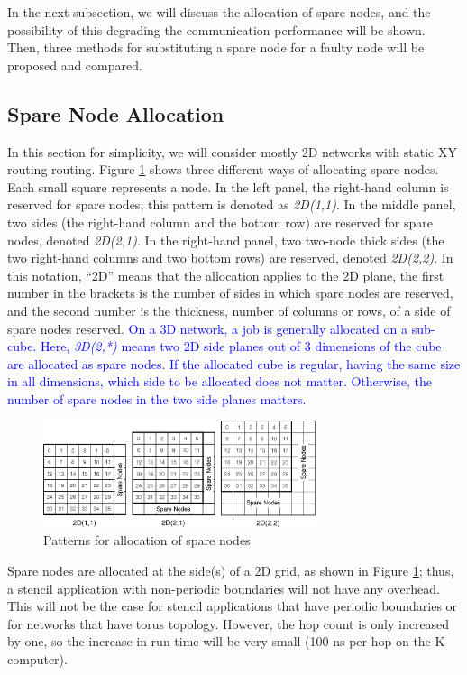 \documentclass[Afour,times,sagev]{sagej}
\newcommand{\AH}[1]{%
  \textcolor{blue}{#1}}%
\begin{document}
In the next subsection, we will discuss the allocation of spare nodes, and
the possibility of this degrading the communication performance will be
shown. Then, three methods for substituting a spare node for a faulty
node will be proposed and compared.

\subsection{Spare Node Allocation}\label{sec:spare-alloc}

In this section for simplicity, we will consider mostly 2D networks with
static XY routing routing\citep{Zhang:2009:CRX:1603897.1605067}.
Figure \ref{fig:sparenode-allocation} shows three different ways of
allocating spare nodes. Each small square represents a node. In the
left panel, the right-hand column is reserved for spare nodes; this
pattern is denoted as {\it 2D(1,1)}. In the middle panel, two sides
(the right-hand column and the bottom row) are reserved for spare
nodes, denoted {\it 2D(2,1)}. In the right-hand panel, two two-node
thick sides (the two right-hand columns and two bottom rows) are
reserved, denoted {\it 2D(2,2)}. In this notation, ``2D'' means that
the allocation applies to the 2D plane, the first number in the
brackets is the number of sides in which spare nodes are reserved, and
the second number is the thickness, number of columns or rows, of a
side of spare nodes reserved. \AH{On a 3D network, a job is generally
allocated on a sub-cube. Here, {\it 3D(2,*)} means two 2D side planes
out of 3 dimensions of the cube are allocated as spare nodes. If the
allocated cube is regular, having the same size in all dimensions,
which side to be allocated does not matter. Otherwise, the number of
spare nodes in the two side planes matters. }

\begin{figure}[ht]
\centering
\includegraphics[width=80mm]{Figs/SpareNodeAllocation.eps}
  \caption{Patterns for allocation of spare nodes }
  \label{fig:sparenode-allocation}
\end{figure}

Spare nodes are allocated at the side(s) of a 2D grid, as shown in
Figure \ref{fig:sparenode-allocation}; thus, a stencil application
with non-periodic boundaries will not have any overhead. This will not
be the case for stencil applications that have periodic boundaries or
for networks that have torus topology. However, the hop count is only
increased by one, so the increase in run time will be very small
(100 ns per hop on the K computer).
\end{document}
